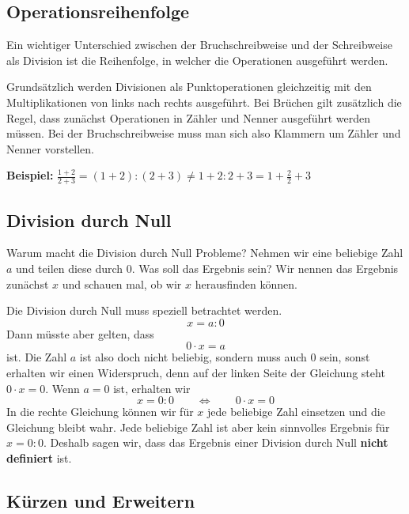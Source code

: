 \subsection{Operationsreihenfolge}

Ein wichtiger Unterschied zwischen der Bruchschreibweise und der Schreibweise als Division ist die Reihenfolge, in welcher die Operationen ausgeführt werden.

Grundsätzlich werden Divisionen als Punktoperationen gleichzeitig mit den Multiplikationen von links nach rechts ausgeführt. Bei Brüchen gilt zusätzlich die Regel, dass zunächst Operationen in Zähler und Nenner ausgeführt werden müssen. Bei der Bruchschreibweise muss man sich also Klammern um Zähler und Nenner vorstellen.
\begin{example}
  \textbf{Beispiel:} $\displaystyle \frac{1+2}{2+3} = (1+2):(2+3) \ne 1+2:2+3 = 1+\frac{2}{2}+3$
\end{example}

\subsection{Division durch Null}

Warum macht die Division durch Null Probleme? Nehmen wir eine beliebige Zahl $a$ und teilen diese durch $0$. Was soll das Ergebnis sein? Wir nennen das Ergebnis zunächst $x$ und schauen mal, ob wir $x$ herausfinden können.

Die Division durch Null muss speziell betrachtet werden.
\[
  x = a:0
\]
Dann müsste aber gelten, dass
\[
  0\cdot x = a
\]
ist. Die Zahl $a$ ist also doch nicht beliebig, sondern muss auch $0$ sein, sonst erhalten wir einen Widerspruch, denn auf der linken Seite der Gleichung steht $0\cdot x = 0$. Wenn $a = 0$ ist, erhalten wir
\[
  x = 0:0 \qquad\Leftrightarrow\qquad 0\cdot x = 0
\]
In die rechte Gleichung können wir für $x$ jede beliebige Zahl einsetzen und die Gleichung bleibt wahr. Jede beliebige Zahl ist aber kein sinnvolles Ergebnis für $x = 0 : 0$. Deshalb sagen wir, dass das Ergebnis einer Division durch Null \textbf{nicht definiert} ist.


\subsection{Kürzen und Erweitern}

